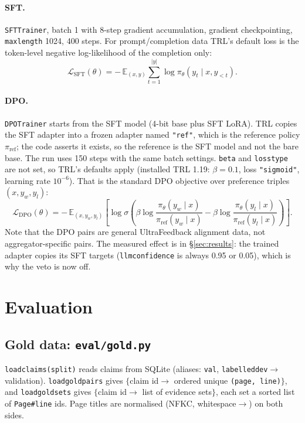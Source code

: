 \documentclass[11pt,a4paper]{article}
\makeatletter
\DeclareRobustCommand{\_}{\ifmmode\nfss@text{\textunderscore}\else\textunderscore\allowbreak\fi}
\newcommand{\file}[1]{\texttt{#1}}
\makeatother
\begin{document}
\paragraph{SFT.} \texttt{SFTTrainer}, batch 1 with 8-step gradient accumulation, gradient checkpointing,
\texttt{max\_length} 1024, 400 steps. For prompt/completion data TRL's default loss is the token-level negative
log-likelihood of the completion only:
\[
  \mathcal{L}_\text{SFT}(\theta) = -\,\mathbb{E}_{(x,y)}\sum_{t=1}^{|y|}\log \pi_\theta(y_t\mid x, y_{<t}).
\]

\paragraph{DPO.} \texttt{DPOTrainer} starts from the SFT model (4-bit base plus SFT LoRA). TRL copies the SFT adapter
into a frozen adapter named \texttt{"ref"}, which is the reference policy $\pi_\text{ref}$; the code asserts it exists,
so the reference is the SFT model and not the bare base. The run uses 150 steps with the same batch settings.
\texttt{beta} and \texttt{loss\_type} are not set, so TRL's defaults apply (installed TRL 1.19: $\beta=0.1$, loss
\texttt{"sigmoid"}, learning rate $10^{-6}$). That is the standard DPO objective over preference triples
$(x, y_w, y_l)$:
\[
  \mathcal{L}_\text{DPO}(\theta) = -\,\mathbb{E}_{(x,y_w,y_l)}\left[\log \sigma\!\left(
     \beta\log\frac{\pi_\theta(y_w\mid x)}{\pi_\text{ref}(y_w\mid x)}
   - \beta\log\frac{\pi_\theta(y_l\mid x)}{\pi_\text{ref}(y_l\mid x)}\right)\right].
\]
Note that the DPO pairs are general UltraFeedback alignment data, not aggregator-specific pairs. The measured
effect is in \S\ref{sec:results}: the trained adapter copies its SFT targets (\texttt{llm\_confidence} is always
0.95 or 0.05), which is why the veto is now off.

\section{Evaluation}\label{sec:eval}

\subsection{Gold data: \file{eval/gold.py}}

\texttt{load\_claims(split)} reads claims from SQLite (aliases: \texttt{val}, \texttt{labelled\_dev}$\to$validation).
\texttt{load\_gold\_pairs} gives $\{$claim id$\to$ ordered unique \texttt{(page, line)}$\}$, and
\texttt{load\_gold\_sets} gives $\{$claim id$\to$ list of evidence sets$\}$, each set a sorted list of
\texttt{Page\#line} ids. Page titles are normalised (NFKC, whitespace$\to$\texttt{\_}) on both sides.
\end{document}
